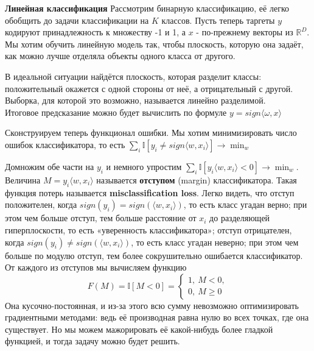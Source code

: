 \textbf{Линейная классификация} Рассмотрим бинарную классификацию, её легко обобщить до задачи классификации на $K$ классов. Пусть теперь таргеты $y$ кодируют принадлежность к множеству -1 и 1, а $x$ - по-прежнему векторы из $\mathbb{R}^D$. Мы хотим обучить линейную модель так, чтобы плоскость, которую она задаёт, как можно лучше отделяла объекты одного класса от другого.

В идеальной ситуации найдётся плоскость, которая разделит классы: положительный окажется с одной стороны от неё, а отрицательный с другой. Выборка, для которой это возможно, называется линейно разделимой. \\
Итоговое предсказание можно будет вычислить по формуле $y = sign\langle\omega,x\rangle$

Сконструируем теперь функционал ошибки. Мы хотим минимизировать число ошибок классификатора, то есть $\sum_i \mathbb{I}[y_i \neq sign \langle w, x_i\rangle]\longrightarrow \min_w$

Домножим обе части на $y_i$ и немного упростим $\sum_i \mathbb{I}[y_i \langle w, x_i\rangle < 0]\longrightarrow \min_w$. Величина $M = y_i \langle w, x_i\rangle$ называется \textbf{отступом} (margin) классификатора. Такая функция потерь называется \textbf{misclassification loss}. Легко видеть, что отступ положителен, когда $sign(y_i) = sign(\langle w, x_i\rangle)$, то есть класс угадан верно; при этом чем больше отступ, тем больше расстояние от $x_i$ до разделяющей гиперплоскости, то есть «уверенность классификатора»; отступ отрицателен, когда $sign(y_i) \ne sign(\langle w, x_i\rangle)$, то есть класс угадан неверно; при этом чем больше по модулю отступ, тем более сокрушительно ошибается классификатор. От каждого из отступов мы вычисляем функцию $$F(M) = \mathbb{I}[M < 0] = \begin{cases}1,\ M < 0,\\ 0,\ M\geqslant 0\end{cases}$$ Она кусочно-постоянная, и из-за этого всю сумму невозможно оптимизировать градиентными методами: ведь её производная равна нулю во всех точках, где она существует. Но мы можем мажорировать её какой-нибудь более гладкой функцией, и тогда задачу можно будет решить.  \\

